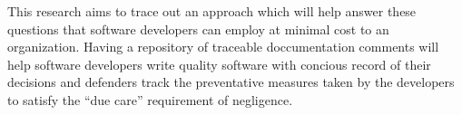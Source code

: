This research aims to trace out an approach which will help answer these
questions that software developers can employ at minimal cost to an 
organization. Having a repository of traceable doccumentation comments will help
software developers write quality software with concious record of their
decisions and defenders track the preventative measures taken by
the developers to satisfy the ``due care'' requirement of negligence.
